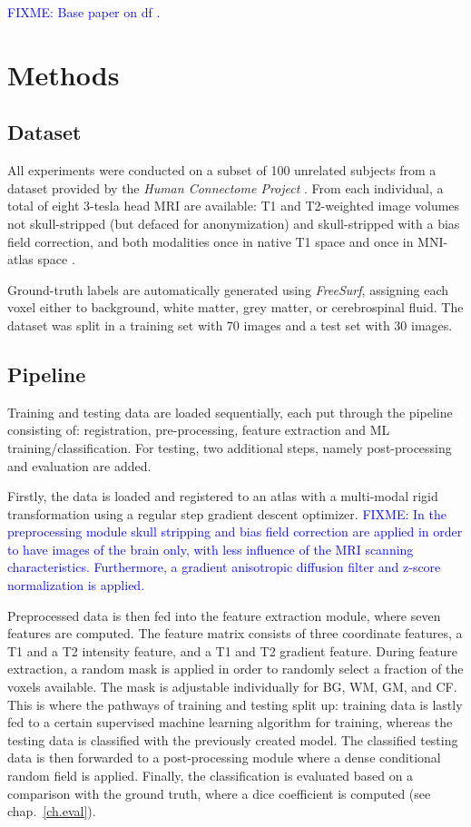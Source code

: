 \documentclass[journal]{IEEEtran}
\newcommand\FIXME[1]{\textcolor{blue}{FIXME: #1}}
\begin{document}
\FIXME{Base paper on df \cite{Breiman2001}.}


\section{Methods}

\subsection{Dataset}
All experiments were conducted on a subset of 100 unrelated subjects from a dataset provided by the \textit{Human Connectome Project} \cite{van2013wu}. From each individual, a total of eight 3-tesla head MRI are available: T1 and T2-weighted image volumes not skull-stripped (but defaced for anonymization) and skull-stripped with a bias field correction, and both modalities once in native T1 space and once in MNI-atlas space \cite{mazziotta2001probabilistic}.

Ground-truth labels are automatically generated using \textit{FreeSurf}, assigning each voxel either to background, white matter, grey matter, or cerebrospinal fluid. The dataset was split in a training set with 70 images and a test set with 30 images.

\subsection{Pipeline}

Training and testing data are loaded sequentially, each put through the pipeline consisting of: registration, pre-processing, feature extraction and ML training/classification. For testing, two additional steps, namely post-processing and evaluation are added.

Firstly, the data is loaded and registered to an atlas with a multi-modal rigid transformation using a regular step gradient descent optimizer. \FIXME{In the preprocessing module skull stripping and bias field correction are applied in order to have images of the brain only, with less influence of the MRI scanning characteristics. Furthermore, a gradient anisotropic diffusion filter and z-score normalization is applied.}

Preprocessed data is then fed into the feature extraction module, where seven features are computed. The feature matrix consists of three coordinate features, a T1 and a T2 intensity feature, and a T1 and T2 gradient feature. During feature extraction, a random mask is applied in order to randomly select a fraction of the voxels available. The mask is adjustable individually for BG, WM, GM, and CF. This is where the pathways of training and testing split up: training data is lastly fed to a certain supervised machine learning algorithm for training, whereas the testing data is classified with the previously created model. The classified testing data is then forwarded to a post-processing module where a dense conditional random field \cite{krahenbuhl2011efficient} is applied.
Finally, the classification is evaluated based on a comparison with the ground truth, where a dice coefficient is computed (see chap.~\ref{ch.eval}).
\end{document}
